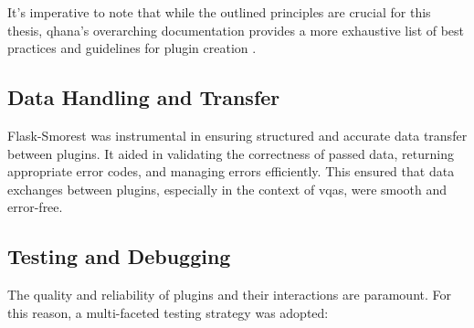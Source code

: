 \documentclass[
  a4paper,  %
  twoside,  %
  bibliography=totoc,
  headsepline,
  cleardoublepage=empty,
  parskip=half,
  draft=false
]{scrbook}
\begin{document}
It's imperative to note that while the outlined principles are crucial for this thesis, \gls{qhana}'s overarching documentation provides a more exhaustive list of best practices and guidelines for plugin creation \cite{Buehler2022}.


\subsection{Data Handling and Transfer}
Flask-Smorest was instrumental in ensuring structured and accurate data transfer between plugins.
It aided in validating the correctness of passed data, returning appropriate error codes, and managing errors efficiently.
This ensured that data exchanges between plugins, especially in the context of \glspl{vqa}, were smooth and error-free.

\subsection{Testing and Debugging}

The quality and reliability of plugins and their interactions are paramount.
For this reason, a multi-faceted testing strategy was adopted:
\end{document}
